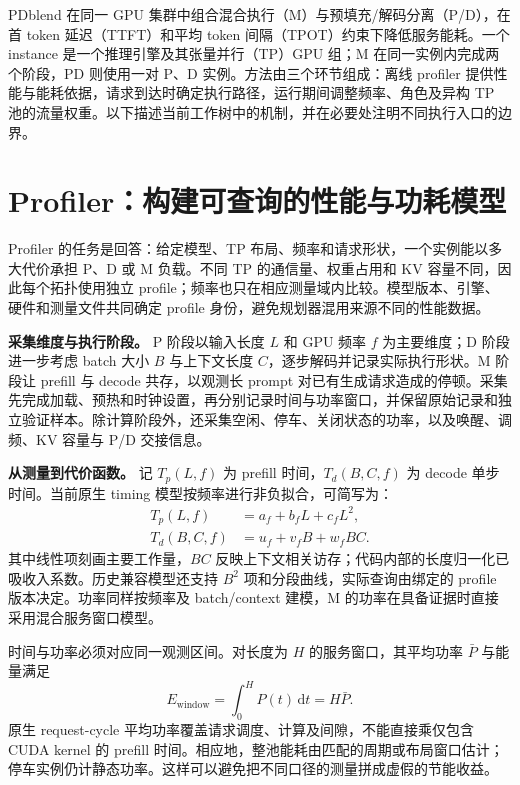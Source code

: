\documentclass[11pt,a4paper,twocolumn]{article}
\newcommand{\para}[1]{\par\noindent\textbf{#1}\quad}
\begin{document}
\pagestyle{plain}
\raggedbottom
{}
PDblend 在同一 GPU 集群中组合混合执行（M）与预填充/解码分离（P/D），在首 token 延迟（TTFT）和平均 token 间隔（TPOT）约束下降低服务能耗。一个 instance 是一个推理引擎及其张量并行（TP）GPU 组；M 在同一实例内完成两个阶段，PD 则使用一对 P、D 实例。方法由三个环节组成：离线 profiler 提供性能与能耗依据，请求到达时确定执行路径，运行期间调整频率、角色及异构 TP 池的流量权重。以下描述当前工作树中的机制，并在必要处注明不同执行入口的边界。
\section{Profiler：构建可查询的性能与功耗模型}
\label{sec:profiler}
Profiler 的任务是回答：给定模型、TP 布局、频率和请求形状，一个实例能以多大代价承担 P、D 或 M 负载。不同 TP 的通信量、权重占用和 KV 容量不同，因此每个拓扑使用独立 profile；频率也只在相应测量域内比较。模型版本、引擎、硬件和测量文件共同确定 profile 身份，避免规划器混用来源不同的性能数据。

\para{采集维度与执行阶段。}
P 阶段以输入长度 $L$ 和 GPU 频率 $f$ 为主要维度；D 阶段进一步考虑 batch 大小 $B$ 与上下文长度 $C$，逐步解码并记录实际执行形状。M 阶段让 prefill 与 decode 共存，以观测长 prompt 对已有生成请求造成的停顿。采集先完成加载、预热和时钟设置，再分别记录时间与功率窗口，并保留原始记录和独立验证样本。除计算阶段外，还采集空闲、停车、关闭状态的功率，以及唤醒、调频、KV 容量与 P/D 交接信息。

\para{从测量到代价函数。}
记 $T_p(L,f)$ 为 prefill 时间，$T_d(B,C,f)$ 为 decode 单步时间。当前原生 timing 模型按频率进行非负拟合，可简写为：
\begin{align}
 T_p(L,f)&=a_f+b_fL+c_fL^2,\\
 T_d(B,C,f)&=u_f+v_fB+w_fBC.
\end{align}
其中线性项刻画主要工作量，$BC$ 反映上下文相关访存；代码内部的长度归一化已吸收入系数。历史兼容模型还支持 $B^2$ 项和分段曲线，实际查询由绑定的 profile 版本决定。功率同样按频率及 batch/context 建模，M 的功率在具备证据时直接采用混合服务窗口模型。

时间与功率必须对应同一观测区间。对长度为 $H$ 的服务窗口，其平均功率 $\bar P$ 与能量满足
\begin{equation}
 E_{\mathrm{window}}=\int_0^H P(t)\,\mathrm{d}t=H\bar P.
\end{equation}
原生 request-cycle 平均功率覆盖请求调度、计算及间隙，不能直接乘仅包含 CUDA kernel 的 prefill 时间。相应地，整池能耗由匹配的周期或布局窗口估计；停车实例仍计静态功率。这样可以避免把不同口径的测量拼成虚假的节能收益。
\end{document}
